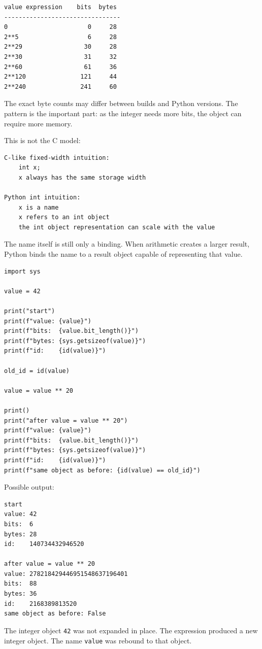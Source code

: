 \begin{verbatim}
value expression    bits  bytes
--------------------------------
0                      0     28
2**5                   6     28
2**29                 30     28
2**30                 31     32
2**60                 61     36
2**120               121     44
2**240               241     60
\end{verbatim}

The exact byte counts may differ between builds and Python versions. The pattern is the important part: as the integer needs more bits, the object can require more memory.

This is not the C model:

\begin{verbatim}
C-like fixed-width intuition:
    int x;
    x always has the same storage width

Python int intuition:
    x is a name
    x refers to an int object
    the int object representation can scale with the value
\end{verbatim}

The name itself is still only a binding. When arithmetic creates a larger result, Python binds the name to a result object capable of representing that value.

\begin{verbatim}
import sys

value = 42

print("start")
print(f"value: {value}")
print(f"bits:  {value.bit_length()}")
print(f"bytes: {sys.getsizeof(value)}")
print(f"id:    {id(value)}")

old_id = id(value)

value = value ** 20

print()
print("after value = value ** 20")
print(f"value: {value}")
print(f"bits:  {value.bit_length()}")
print(f"bytes: {sys.getsizeof(value)}")
print(f"id:    {id(value)}")
print(f"same object as before: {id(value) == old_id}")
\end{verbatim}

Possible output:

\begin{verbatim}
start
value: 42
bits:  6
bytes: 28
id:    140734432946520

after value = value ** 20
value: 278218429446951548637196401
bits:  88
bytes: 36
id:    2168389813520
same object as before: False
\end{verbatim}

The integer object \texttt{42} was not expanded in place. The expression produced a new integer object. The name \texttt{value} was rebound to that object.


